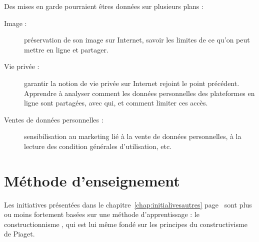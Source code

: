 Des mises en garde pourraient êtres données sur plusieurs plans :

\begin{description}
  \item[Image :] préservation de son image sur Internet, savoir les limites de ce qu'on peut mettre en ligne et partager.
  \item[Vie privée :] garantir la notion de vie privée sur Internet rejoint le point précédent. Apprendre à analyser comment les données personnelles des plateformes en ligne sont partagées, avec qui, et comment limiter ces accès.
  \item[Ventes de données personnelles :] sensibilisation au marketing lié à la vente de données personnelles, à la lecture des condition générales d'utilisation, etc.
\end{description}

\section{Méthode d'enseignement}

Les initiatives présentées dans le chapitre~\ref{chap:initialivesautres} page~\pageref{chap:initialivesautres} sont plus ou moins fortement basées sur une méthode d'apprentissage : le \og constructionnisme \fg{}, qui est lui même fondé sur les principes du constructivisme de Piaget.

